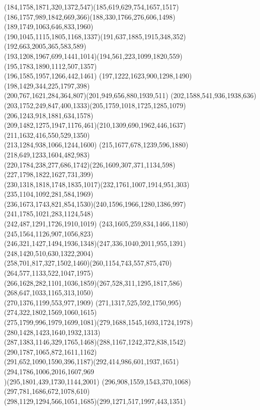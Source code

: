 \documentclass[a4paper,twopage,reqno,12pt]{amsart}
\theoremstyle{definition}
\numberwithin{equation}{section}
\begin{document}
\begin{enumerate}
{{(184,1758,1871,320,1372,547)(185,619,629,754,1657,1517)\\(186,1757,989,1842,669,366)(188,330,1766,276,606,1498)
(189,1749,1063,646,833,1960)\\(190,1045,1115,1805,1168,1337)(191,637,1885,1915,348,352)(192,663,2005,365,583,589)\\
(193,1208,1967,699,1441,1014)(194,561,223,1099,1820,559)(195,1783,1890,1112,507,1357)\\(196,1585,1957,1266,442,1461)
(197,1222,1623,900,1298,1490)(198,1429,344,225,1797,398)\\(200,767,1621,284,364,807)(201,949,656,880,1939,511)
(202,1588,541,936,1938,636)\\(203,1752,249,847,400,1333)(205,1759,1018,1725,1285,1079)(206,1243,918,1881,634,1578)\\
(209,1482,1275,1947,1176,461)(210,1309,690,1962,446,1637)(211,1632,416,550,529,1350)\\(213,1284,938,1066,1244,1600)
(215,1677,678,1239,596,1880)(218,649,1233,1604,482,983)\\(220,1784,238,277,686,1742)(226,1609,307,371,1134,598)
(227,1798,1822,1627,731,399)\\(230,1318,1818,1748,1835,1017)(232,1761,1007,1914,951,303)(235,1104,1092,281,584,1969)\\
(236,1673,1743,821,854,1530)(240,1596,1966,1280,1386,997)(241,1785,1021,283,1124,548)\\(242,487,1291,1726,1910,1019)
(243,1605,259,834,1466,1180)(245,1564,1126,907,1056,823)\\(246,321,1427,1494,1936,1348)(247,336,1040,2011,955,1391)
(248,1420,510,630,1322,2004)\\(258,701,817,327,1502,1460)(260,1154,743,557,875,470)(264,577,1133,522,1047,1975)\\
(266,1628,282,1101,1036,1859)(267,528,311,1295,1817,586)(268,647,1033,1165,313,1050)\\(270,1376,1199,553,977,1909)
(271,1317,525,592,1750,995)(274,322,1802,1569,1060,1615)\\(275,1799,996,1979,1699,1081)(279,1688,1545,1693,1724,1978)
(280,1428,1423,1640,1932,1313)\\(287,1383,1146,329,1765,1468)(288,1167,1242,372,838,1542)(290,1787,1065,872,1611,1162)\\
(291,652,1090,1590,396,1187)(292,414,986,601,1937,1651)(294,1786,1006,2016,1607,969\\)(295,1801,439,1730,1144,2001)
(296,908,1559,1543,370,1068)(297,781,1686,672,1078,610)\\(298,1129,1294,566,1051,1685)(299,1271,517,1997,443,1351)
}}
\end{enumerate}
\end{document}
